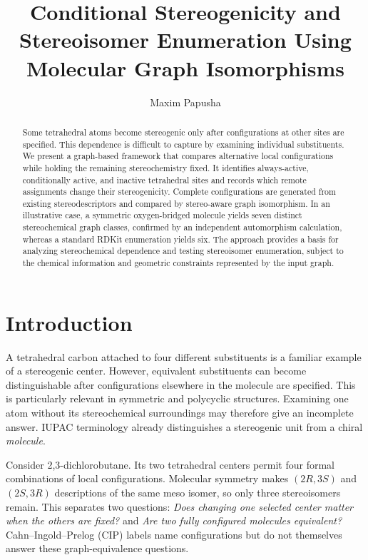 \documentclass[journal=jcisd8,manuscript=article]{achemso}
\title{Conditional Stereogenicity and Stereoisomer Enumeration Using Molecular Graph Isomorphisms}
\author{Maxim Papusha}
\begin{document}
\begin{abstract}
Some tetrahedral atoms become stereogenic only after configurations at other
sites are specified. This dependence is difficult to capture by examining
individual substituents. We present a graph-based framework that compares
alternative local configurations while holding the remaining stereochemistry
fixed. It identifies always-active, conditionally active, and inactive
tetrahedral sites and records which remote assignments change their
stereogenicity. Complete configurations are generated from existing
stereodescriptors and compared by stereo-aware graph isomorphism. In an
illustrative case, a symmetric oxygen-bridged molecule yields seven distinct
stereochemical graph classes, confirmed by an independent automorphism
calculation, whereas a standard RDKit enumeration yields six. The approach
provides a basis for analyzing stereochemical dependence and testing
stereoisomer enumeration, subject to the chemical information and
geometric constraints represented by the input graph.

\end{abstract}


\section{Introduction}
\label{sec:intro}

A tetrahedral carbon attached to four different substituents is a familiar
example of a stereogenic center. However, equivalent substituents can
become distinguishable after configurations elsewhere in the molecule
are specified. This is particularly relevant in symmetric and polycyclic
structures. Examining one atom without its stereochemical surroundings
may therefore give an incomplete answer. IUPAC terminology already
distinguishes a stereogenic unit from a chiral \emph{molecule}.\cite{Moss1996,FavrePowell2014}

Consider 2,3-dichlorobutane. Its two tetrahedral centers permit four
formal combinations of local configurations. Molecular symmetry makes
$(2R,3S)$ and $(2S,3R)$ descriptions of the same meso isomer, so only
three stereoisomers remain. This separates two questions:
\emph{Does changing one selected center matter when the others are fixed?}
and \emph{Are two fully configured molecules equivalent?}
Cahn--Ingold--Prelog (CIP) labels name configurations but do not
themselves answer these graph-equivalence questions.\cite{FavrePowell2014,Hanson2018}
\end{document}
